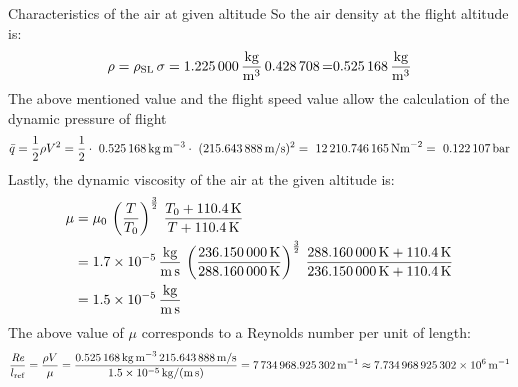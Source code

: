 \documentclass[[12pt,twoside]{book}
\begin{document}
\begin{myExampleX}{Characteristics of the air at given altitude}{}
So the air density at the flight altitude is:
\[
\rho = \rho_\text{SL} \, \sigma 
     = \SI[round-precision=3]{\myDensitysealevel}{\si{\frac{kg}{m^{3}}}} \, \SI[round-precision=3]{\myRelativedensity} 
     = \SI[round-precision=3]{\myDensity}{\si{\frac{kg}{m^{3}}}}
\]
%
The above mentioned value and the flight speed value allow the calculation of the dynamic pressure of flight
\[
\bar{q}=\frac{1}{2} \rho V^{2} =\frac{1}{2}\cdot\ \SI[round-precision=3]{\myDensity}{kg~m^{-3}} \cdot\ (\SI[round-precision=2]{\mySpeedMs}{m/s})^{2} =~\SI[round-precision=2]{\myDynamicpressureNm}{N m^{-2}}=~\SI[round-precision=3]{\myDynamicpressureBar}{bar}
\]
Lastly, the dynamic viscosity of the air at the given  altitude is:
\[
\begin{split}
\mu & {}= \mu_0 \, \left(\frac{T}{T_0}\right)^{\frac{3}{2}} \,                 \frac {T_0 + \SI{110.4}{K}}{T + \SI{110.4}{K}}
    \\
     & {}=\SI[round-precision=1,scientific-notation=true]{\myCone}  {\si {\frac{kg}{m\,s}}}\, \left(\frac{\SI[round-precision=2]{\myTemperatureK}{K}}  {\SI[round-precision=2]{\myTemperaturesealevelK}{K}}
     \right)^{\frac{3}{2}} \,  \frac{\SI[round-precision=2]{\myTemperaturesealevelK}{K} + \SI{110.4}{K}}{\SI[round-precision=2]{\myTemperatureK}{K} + \SI{110.4}{K}}
     \\
     & {}=\SI[round-precision=1,scientific-notation=true]{
     \myDynamicviscosity } {\si {\frac{kg}{m\,s}}}
\end{split}
\]
The above value of $\mu$ corresponds to a Reynolds number per unit of length:
\[
 \frac{\text{\itshape{Re}}}{l_\text{ref}} 
   = \frac{\rho V}{\mu}
   = \frac{
     \SI[round-precision=3]{\myDensity}{kg\,m^{-3}}\,
       \SI[round-precision=2]{\mySpeedMs}{m/s}
       }{
         \SI[round-precision=2,scientific-notation=true]{\myDynamicviscosity}{kg/(m\,s)}
       }
 = \SI[round-precision=0]{\myReynoldsnumeberperunitoflenght}{m^{-1}}
 \approx \SI[scientific-notation=engineering,round-precision=2]{\myReynoldsnumeberperunitoflenght}{m^{-1}}
\]
\end{myExampleX}
\end{document}
